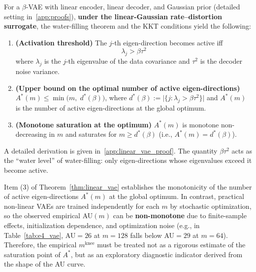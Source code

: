 \documentclass[make,article,submit,pdftex,moreauthors]{Definitions/mdpi}
\newcommand{\mknee}{m^{\mathrm{knee}}}
\begin{document}
\begin{Theorem}\label{thm:linear_vae}
For a $\beta$-VAE with linear encoder, linear decoder, and Gaussian prior
(detailed setting in~\ref{app:proofs}),
\textbf{under the linear-Gaussian rate--distortion surrogate},
the water-filling theorem and the KKT conditions yield the following:

\begin{enumerate}
  \item \textbf{(Activation threshold)} The $j$-th eigen-direction becomes active iff
        \begin{equation}
          \lambda_j > \beta \tau^2 \label{eq:au_threshold}
        \end{equation}
        where $\lambda_j$ is the $j$-th eigenvalue of the data covariance and
        $\tau^2$ is the decoder noise variance.
  \item \textbf{(Upper bound on the optimal number of active eigen-directions)}
        $A^*(m) \leq \min\bigl(m,\; d^*(\beta)\bigr)$, where
        $d^*(\beta) := \bigl|\{j : \lambda_j > \beta\tau^2\}\bigr|$
        and $A^*(m)$ is the number of active eigen-directions at the global optimum.
  \item \textbf{(Monotone saturation at the optimum)}
        $A^*(m)$ is monotone non-decreasing in $m$ and saturates for
        $m \geq d^*(\beta)$ (i.e., $A^*(m) = d^*(\beta)$).
\end{enumerate}

\noindent
A detailed derivation is given in~\ref{app:linear_vae_proof}.
The quantity $\beta\tau^2$ acts as the ``water level'' of water-filling:
only eigen-directions whose eigenvalues exceed it become active.
\end{Theorem}

\begin{Remark}
Item (3) of Theorem~\ref{thm:linear_vae} establishes the monotonicity of the number of
active eigen-directions $A^*(m)$ at the global optimum.
In contrast, practical non-linear VAEs are trained independently for each $m$ by
stochastic optimization, so the observed empirical AU$(m)$ can be
\textbf{non-monotone} due to finite-sample effects, initialization dependence, and
optimization noise
(e.g., in Table~\ref{tab:e4_vae}, AU$=26$ at $m=128$ falls below AU$=29$ at $m=64$).
Therefore, the empirical $\mknee$ must be treated not as a rigorous estimate of the
saturation point of $A^*$, but as an exploratory diagnostic indicator derived from the
shape of the AU curve.
\end{Remark}
\end{document}
